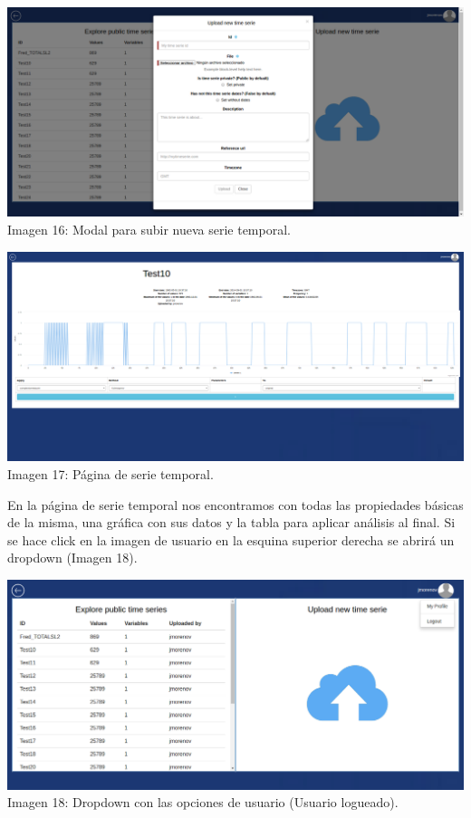 \documentclass[14pt]{extarticle}
\theoremstyle{definition}
\theoremstyle{remark}
\begin{document}
\begin{center}
\includegraphics[scale=0.35]{UploadTimeSeries.png}
\\Imagen 16: Modal para subir nueva serie temporal.
\end{center}

\begin{center}
\includegraphics[scale=0.35]{TimeSeriesPage.png}
\\Imagen 17: Página de serie temporal.
\end{center}

En la página de serie temporal nos encontramos con todas las propiedades básicas de la misma, una gráfica con sus datos y la tabla para aplicar análisis al final. Si se hace click en la imagen de usuario en la esquina superior derecha se abrirá un dropdown (Imagen 18).

\begin{center}
\includegraphics[scale=0.35]{DropdownUser.png}
\\Imagen 18: Dropdown con las opciones de usuario (Usuario logueado).
\end{center}
\end{document}
